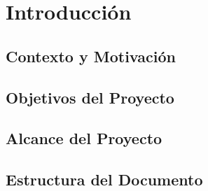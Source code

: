 
\chapter{Introducción}

\section{Contexto y Motivación}

\section{Objetivos del Proyecto}

\section{Alcance del Proyecto}

\section{Estructura del Documento}